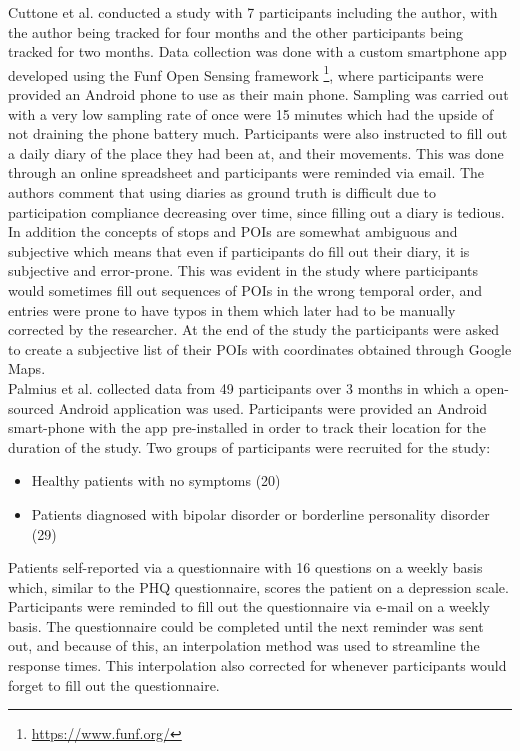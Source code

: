 Cuttone et al. conducted a study with 7 participants including the author, with the author being tracked for four months and the other participants being tracked for two months. Data collection was done with a custom smartphone app developed using the Funf Open Sensing framework \footnote{\url{https://www.funf.org/}}, where participants were provided an Android phone to use as their main phone. Sampling was carried out with a very low sampling rate of once were 15 minutes which had the upside of not draining the phone battery much. Participants were also instructed to fill out a daily diary of the place they had been at, and their movements. This was done through an online spreadsheet and participants were reminded via email. The authors comment that using diaries as ground truth is difficult due to participation compliance decreasing over time, since filling out a diary is tedious. In addition the concepts of stops and POIs are somewhat ambiguous and subjective which means that even if participants do fill out their diary, it is subjective and error-prone. This was evident in the study where participants would sometimes fill out sequences of POIs in the wrong temporal order, and entries were prone to have typos in them which later had to be manually corrected by the researcher. At the end of the study the participants were asked to create a subjective list of their POIs with coordinates obtained through Google Maps. \\

Palmius et al. collected data from 49 participants over 3 months in which a open-sourced Android application was used. Participants were provided an Android smart-phone with the app pre-installed in order to track their location for the duration of the study. Two groups of participants were recruited for the study:

\begin{itemize}
    \item Healthy patients with no symptoms (20)
    \item Patients diagnosed with bipolar disorder or borderline personality disorder (29)
\end{itemize}

Patients self-reported via a questionnaire with 16 questions on a weekly basis which, similar to the PHQ questionnaire, scores the patient on a depression scale. Participants were reminded to fill out the questionnaire via e-mail on a weekly basis. The questionnaire could be completed until the next reminder was sent out, and because of this, an interpolation method was used to streamline the response times. This interpolation also corrected for whenever participants would forget to fill out the questionnaire. 


